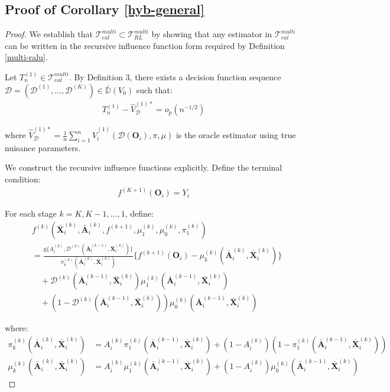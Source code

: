\documentclass[11pt]{article}
\theoremstyle{referenceplain}
\theoremstyle{referencedefinition}
\theoremstyle{referenceremark}
\begin{document}
\subsection{Proof of Corollary \ref{hyb-general}}
\begin{proof}
We establish that $\mathcal{T}_{eal}^{multi} \subset \mathcal{T}_{RL}^{multi}$ by showing that any estimator in $\mathcal{T}_{eal}^{multi}$ can be written in the recursive influence function form required by Definition \ref{multi-ralu}.

Let $T_n^{(1)} \in \mathcal{T}_{eal}^{multi}$. By Definition 3, there exists a decision function sequence $\mathcal{D} = (\mathcal{D}^{(1)}, \ldots, \mathcal{D}^{(K)}) \in \bar{\mathbb{D}}(V_0)$ such that:
\begin{align*}
    T_n^{(1)} - \widehat{V}_{\mathcal{D}}^{(1)*} = o_p(n^{-1/2})
\end{align*}

where $\widehat{V}_{\mathcal{D}}^{(1)*} = \frac{1}{n}\sum_{i=1}^n \widehat{V}_i^{(1)}(\mathcal{D}(\mathbf{O}_i), \pi, \mu)$ is the oracle estimator using true nuisance parameters.

We construct the recursive influence functions explicitly. Define the terminal condition:
\begin{align*}
    f^{(K+1)}(\mathbf{O}_i) = Y_i
\end{align*}

For each stage $k = K, K-1, \ldots, 1$, define:
\begin{align*}
    &f^{(k)}(\bar{\mathbf{X}}_i^{(k)}, \bar{\mathbf{A}}_i^{(k)}, f^{(k+1)}, \mu_1^{(k)}, \mu_0^{(k)}, \pi_1^{(k)})\\
    &= \frac{\mathrm{g}\{A_i^{(k)}, \mathcal{D}^{(k)}(\bar{\mathbf{A}}_i^{(k-1)}, \bar{\mathbf{X}}_i^{(k)})\}}{\pi_k^{(k)}(\bar{\mathbf{A}}_i^{(k)}, \bar{\mathbf{X}}_i^{(k)})} \{f^{(k+1)}(\mathbf{O}_i) - \mu_k^{(k)}(\bar{\mathbf{A}}_i^{(k)}, \bar{\mathbf{X}}_i^{(k)})\}\\
    &\quad + \mathcal{D}^{(k)}(\bar{\mathbf{A}}_i^{(k-1)}, \bar{\mathbf{X}}_i^{(k)}) \mu_1^{(k)}(\bar{\mathbf{A}}_i^{(k-1)}, \bar{\mathbf{X}}_i^{(k)})\\
    &\quad + (1-\mathcal{D}^{(k)}(\bar{\mathbf{A}}_i^{(k-1)}, \bar{\mathbf{X}}_i^{(k)})) \mu_0^{(k)}(\bar{\mathbf{A}}_i^{(k-1)}, \bar{\mathbf{X}}_i^{(k)})
\end{align*}

where:
\begin{align*}
    \pi_k^{(k)}(\bar{\mathbf{A}}_i^{(k)}, \bar{\mathbf{X}}_i^{(k)}) &= A_i^{(k)}\pi_1^{(k)}(\bar{\mathbf{A}}_i^{(k-1)}, \bar{\mathbf{X}}_i^{(k)}) + (1-A_i^{(k)})(1-\pi_1^{(k)}(\bar{\mathbf{A}}_i^{(k-1)}, \bar{\mathbf{X}}_i^{(k)}))\\
    \mu_k^{(k)}(\bar{\mathbf{A}}_i^{(k)}, \bar{\mathbf{X}}_i^{(k)}) &= A_i^{(k)} \mu_1^{(k)}(\bar{\mathbf{A}}_i^{(k-1)}, \bar{\mathbf{X}}_i^{(k)}) + (1-A_i^{(k)}) \mu_0^{(k)}(\bar{\mathbf{A}}_i^{(k-1)}, \bar{\mathbf{X}}_i^{(k)})
\end{align*}


\end{proof}
\end{document}
